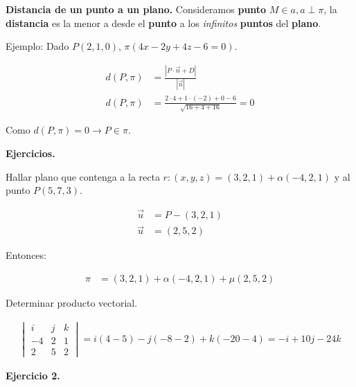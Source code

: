 \documentclass{article}
\begin{document}
\textbf{Distancia de un punto a un plano.} Consideramos \textbf{punto} 
\(M \in a, a \perp \pi\), la \textbf{distancia} es la menor a desde el 
\textbf{punto} a los \textit{infinitos} \textbf{puntos} del \textbf{plano}.

Ejemplo: Dado \(P (2, 1, 0)\), \(\pi (4x - 2y + 4z - 6 = 0)\).

\begin{align*}
    d(P,\pi) & = \frac{|P \cdot \vec{n} + D|}{|\vec{n}|}\\
    d(P,\pi) & = \frac{2 \cdot 4 + 1 \cdot (-2) + 0 - 6}{\sqrt{16 + 4 + 16}} = 0
\end{align*}

Como \(d(P, \pi) = 0 \rightarrow P \in \pi\).

\textbf{Ejercicios.} 

Hallar plano que contenga a la recta 
\(r: (x,y,z) = (3,2,1) + \alpha(-4,2,1)\) y al punto \(P (5,7,3)\).

\begin{align*}
    \vec{u} & = P - (3,2,1)\\
    \vec{u} & = (2,5,2)
\end{align*}

Entonces:

\begin{align*}
    \pi & = (3,2,1) + \alpha (-4,2,1) + \mu (2,5,2)
\end{align*}

Determinar producto vectorial.

\begin{align*}
    \begin{vmatrix}
        i & j & k \\
        -4 & 2 & 1 \\
        2 & 5 & 2
    \end{vmatrix} = i (4 - 5) - j (-8 - 2) + k (-20 - 4) = -i + 10j - 24k
\end{align*}

\textbf{Ejercicio 2.} 
\end{document}
